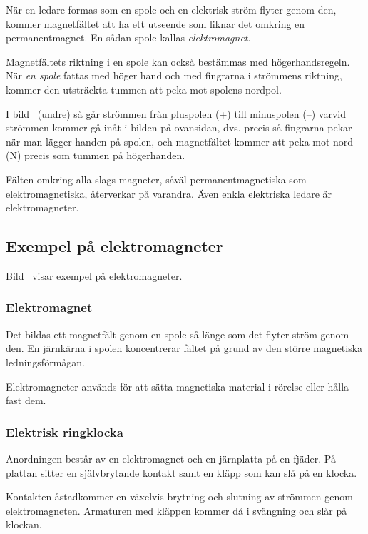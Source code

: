 När en ledare formas som en spole och en elektrisk ström flyter genom den,
kommer magnetfältet att ha ett utseende som liknar det omkring en
permanentmagnet.
En sådan spole kallas \emph{elektromagnet}.

Magnetfältets riktning i en spole kan också bestämmas med högerhandsregeln.
När \emph{en spole} fattas med höger hand och med fingrarna i strömmens
riktning, kommer den utsträckta tummen att peka mot spolens nordpol.

I bild~ (undre) så går strömmen från pluspolen (+) till
minuspolen (--) varvid strömmen kommer gå inåt i bilden på ovansidan, dvs.
precis så fingrarna pekar när man lägger handen på spolen, och magnetfältet
kommer att peka mot nord (N) precis som tummen på högerhanden.

Fälten omkring alla slags magneter, såväl permanentmagnetiska som
elektromagnetiska, återverkar på varandra.
Även enkla elektriska ledare är elektromagneter.


\subsection{Exempel på elektromagneter}

Bild~ visar exempel på elektromagneter.

\subsubsection{Elektromagnet}
Det bildas ett magnetfält genom en spole så länge som det flyter ström genom
den.
En järnkärna i spolen koncentrerar fältet på grund av den större magnetiska
ledningsförmågan.

Elektromagneter används för att sätta magnetiska material i rörelse eller hålla
fast dem.

\subsubsection{Elektrisk ringklocka}
Anordningen består av en elektromagnet och en järnplatta på en fjäder.
På plattan sitter en självbrytande kontakt samt en kläpp som kan slå på en
klocka.

Kontakten åstadkommer en växelvis brytning och slutning av strömmen genom
elektromagneten.
Armaturen med kläppen kommer då i svängning och slår på klockan.

